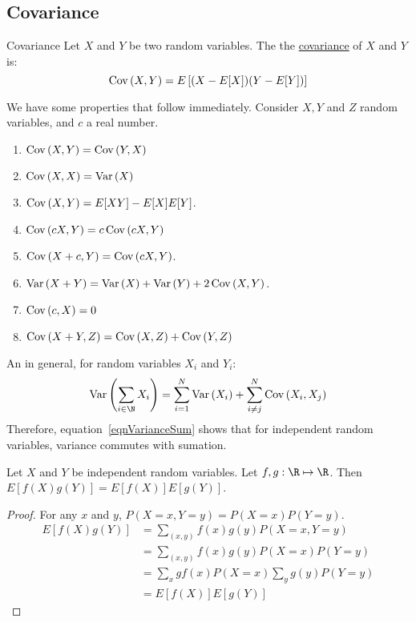 \documentclass[../Main.tex]{subfiles}
\begin{document}
\subsection{Covariance}
\begin{definition}{Covariance}
    Let $X$ and $Y$ be two random variables. The the \underline{covariance} of $X$ and $Y$ is:
    \begin{equation}
        \operatorname{Cov}{(X, Y)} = E\left[(X - E[X])(Y - E[Y])\right]
        \label{eqnCovariance}
    \end{equation}
\end{definition}
We have some properties that follow immediately. Consider $X, Y$ and $Z$ random variables, and $c$ a real number.
\begin{enumerate}
    \item $\operatorname{Cov}{(X, Y)} = \operatorname{Cov}{(Y, X)}$
    \item $\operatorname{Cov}{(X, X)} = \operatorname{Var}{(X)}$
    \item $\operatorname{Cov}{(X, Y)} = E[XY] - E[X]E[Y]$.
    \item $\operatorname{Cov}{(cX, Y)} = c\operatorname{Cov}{(cX, Y)}$
    \item $\operatorname{Cov}{(X + c, Y)} = \operatorname{Cov}{(cX, Y)}$.
    \item $\operatorname{Var}{(X + Y)} = \operatorname{Var}{(X)} + \operatorname{Var}{(Y)} + 2\operatorname{Cov}{(X,Y)}$.
    \item $\operatorname{Cov}{(c, X)} = 0$
    \item $\operatorname{Cov}{(X + Y, Z)} = \operatorname{Cov}{(X, Z)} + \operatorname{Cov}{(Y, Z)}$
\end{enumerate}
An in general, for random variables $X_i$ and $Y_i$:
\begin{equation}
    \Var{\left(\sum_{i \in \N} X_i\right)} = \sum_{i=1}^N \Var{(X_i)} + \sum_{i \neq j}^N \Cov{(X_i, X_j)}
    \label{eqnVarianceSum}
\end{equation}
Therefore, equation~\ref{eqnVarianceSum} shows that for independent random variables, variance commutes with sumation.
\begin{lemma}
    Let $X$ and $Y$ be independent random variables. Let $f, g : \R \mapsto \R$. Then $E[f(X)g(Y)] = E[f(X)]E[g(Y)]$.
\end{lemma}
\begin{proof}
    For any $x$ and $y$, $P(X = x, Y = y) = P(X = x)P(Y = y)$.
    \begin{align*}
        E[f(X)g(Y)] &= \sum_{(x, y)} f(x) g(y) P(X = x, Y = y) \\
        &= \sum_{(x, y)} f(x) g(y) P(X = x)P(Y = y) \\
        &= \sum_x gf(x) P(X = x) \sum_y g(y) P(Y = y) \\
        &= E[f(X)]E[g(Y)]
    \end{align*}
\end{proof}
\end{document}
